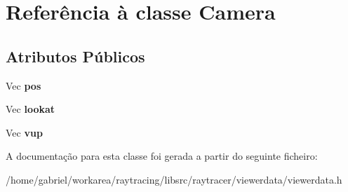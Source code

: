 \hypertarget{classCamera}{}\section{Referência à classe Camera}
\label{classCamera}
\subsection*{Atributos Públicos}
\begin{DoxyCompactItemize}
\item 
\mbox{\label{classCamera_a56ecb917a35453503d0b162bc9602bd2}} 
Vec {\bfseries pos}
\item 
\mbox{\label{classCamera_a39af9b8f99ed7a507d08be930b9ca691}} 
Vec {\bfseries lookat}
\item 
\mbox{\label{classCamera_a4a24ba3577fd873d760cb22291d45c4e}} 
Vec {\bfseries vup}
\end{DoxyCompactItemize}


A documentação para esta classe foi gerada a partir do seguinte ficheiro\+:\begin{DoxyCompactItemize}
\item 
/home/gabriel/workarea/raytracing/libsrc/raytracer/viewerdata/viewerdata.\+h\end{DoxyCompactItemize}
